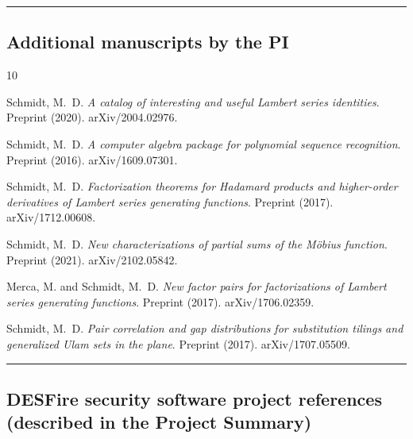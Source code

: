\documentclass[10pt,reqno,letterpaper]{article}
\theoremstyle{plain}
\numberwithin{theorem}{section}
\theoremstyle{definition}
\newcounter{completeBibitemIncrementCtr}
\renewenvironment{thebibliography}[1]{
     \renewcommand{\refname}{} 
     
     \begin{oldthebibliography}{#1}
     \setlength{\itemsep}{-0.6mm}
     \setlength{\parskip}{0em}
     \setlength{\topsep}{0pt}
     \setlength{\partopsep}{0pt}
     \setcounter{enumiv}{\value{completeBibitemIncrementCtr}}
     \normalsize%
}
{
     \setcounter{completeBibitemIncrementCtr}{\value{enumiv}}
     \end{oldthebibliography}
}
\begin{document}
\vskip -1.5mm
\hrule\medskip
\subsection{Additional manuscripts by the PI} 

\vskip -4mm
\begin{thebibliography}{10}

Schmidt, M.~D. \emph{A catalog of interesting and useful Lambert series identities}. 
Preprint (2020). 
arXiv/2004.02976.

Schmidt, M.~D. \emph{A computer algebra package for polynomial sequence recognition}. 
Preprint (2016). 
arXiv/1609.07301.

Schmidt, M.~D. \emph{Factorization theorems for Hadamard products and 
                     higher-order derivatives of Lambert series generating functions}. 
Preprint (2017). 
arXiv/1712.00608.

Schmidt, M.~D. \emph{New characterizations of partial sums of the M\"{o}bius function}. 
Preprint (2021). 
arXiv/2102.05842.

Merca, M. and Schmidt, M.~D. \emph{New factor pairs for factorizations of Lambert series generating functions}. 
Preprint (2017). 
arXiv/1706.02359.

Schmidt, M.~D. \emph{Pair correlation and gap distributions for substitution tilings and 
                     generalized Ulam sets in the plane}. 
Preprint (2017). 
arXiv/1707.05509.

\end{thebibliography}

\vskip -1.5mm
\hrule\medskip
\subsection{DESFire security software project references (described in the Project Summary)} 
\label{page_BibliographyB_SubSection_DESFireProjectRefs} 
\end{document}
